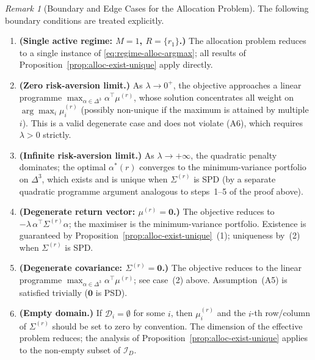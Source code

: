 \documentclass[12pt,openany]{book}
\numberwithin{equation}{chapter}
\theoremstyle{plain}
\theoremstyle{definition}
\theoremstyle{remark}
\newtheorem{remark}[theorem]{Remark}
\numberwithin{equation}{chapter}
\theoremstyle{plain}
\newcommand{\calR}{\mathcal{R}}
\def\calR{R}%
\begin{document}
\begin{remark}[Boundary and Edge Cases for the Allocation Problem]
\label{rem:alloc-boundary}
The following boundary conditions are treated explicitly.
\begin{enumerate}
  \item \textbf{(Single active regime: $M = 1$, $\calR = \{r_1\}$.)}
        The allocation problem reduces to a single instance of
        \eqref{eq:regime-alloc-argmax}; all results of
        Proposition~\ref{prop:alloc-exist-unique} apply directly.

  \item \textbf{(Zero risk-aversion limit.)}
        As $\lambda \to 0^+$, the objective approaches a linear programme
        $\max_{\alpha \in \Delta^3} \alpha^\top \mu^{(r)}$, whose
        solution concentrates all weight on
        $\arg\max_{i} \mu_i^{(r)}$ (possibly non-unique if the maximum
        is attained by multiple $i$).  This is a valid degenerate case
        and does not violate (A6), which requires $\lambda > 0$ strictly.

  \item \textbf{(Infinite risk-aversion limit.)}
        As $\lambda \to +\infty$, the quadratic penalty dominates; the
        optimal $\alpha^{*}(r)$ converges to the minimum-variance
        portfolio on $\Delta^{3}$, which exists and is unique when
        $\Sigma^{(r)}$ is SPD (by a separate quadratic programme argument
        analogous to steps~1--5 of the proof above).

  \item \textbf{(Degenerate return vector: $\mu^{(r)} = \mathbf{0}$.)}
        The objective reduces to
        $-\lambda\,\alpha^\top\Sigma^{(r)}\alpha$; the maximiser
        is the minimum-variance portfolio.  Existence is guaranteed by
        Proposition~\ref{prop:alloc-exist-unique}~(1); uniqueness by~(2)
        when $\Sigma^{(r)}$ is SPD.

  \item \textbf{(Degenerate covariance: $\Sigma^{(r)} = \mathbf{0}$.)}
        The objective reduces to the linear programme
        $\max_{\alpha \in \Delta^3} \alpha^\top \mu^{(r)}$; see
        case~(2) above.  Assumption~(A5) is satisfied trivially
        ($\mathbf{0}$ is PSD).

  \item \textbf{(Empty domain.)}
        If $\mathcal{D}_i = \emptyset$ for some $i$, then $\mu_i^{(r)}$
        and the $i$-th row/column of $\Sigma^{(r)}$ should be set to
        zero by convention.  The dimension of the effective problem
        reduces; the analysis of Proposition~\ref{prop:alloc-exist-unique}
        applies to the non-empty subset of $\mathcal{I}_D$.
\end{enumerate}
\end{remark}
\end{document}
